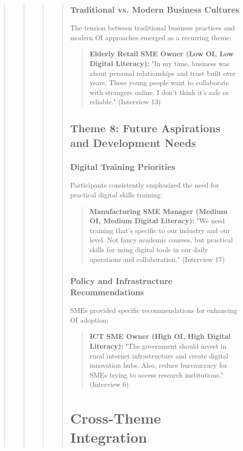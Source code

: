 \begin{quote}
\begin{quote}
\begin{quote}
\begin{quote}
\subsubsection{Traditional vs. Modern Business Cultures}
The tension between traditional business practices and modern OI approaches emerged as a recurring theme:

\begin{quote}
\textbf{Elderly Retail SME Owner (Low OI, Low Digital Literacy):} "In my time, business was about personal relationships and trust built over years. These young people want to collaborate with strangers online. I don't think it's safe or reliable." (Interview 13)
\end{quote}

\subsection{Theme 8: Future Aspirations and Development Needs}

\subsubsection{Digital Training Priorities}
Participants consistently emphasized the need for practical digital skills training:

\begin{quote}
\textbf{Manufacturing SME Manager (Medium OI, Medium Digital Literacy):} "We need training that's specific to our industry and our level. Not fancy academic courses, but practical skills for using digital tools in our daily operations and collaboration." (Interview 17)
\end{quote}

\subsubsection{Policy and Infrastructure Recommendations}
SMEs provided specific recommendations for enhancing OI adoption:

\begin{quote}
\textbf{ICT SME Owner (High OI, High Digital Literacy):} "The government should invest in rural internet infrastructure and create digital innovation hubs. Also, reduce bureaucracy for SMEs trying to access research institutions." (Interview 6)
\end{quote}

\section{Cross-Theme Integration}


\end{quote}
\end{quote}
\end{quote}
\end{quote}
